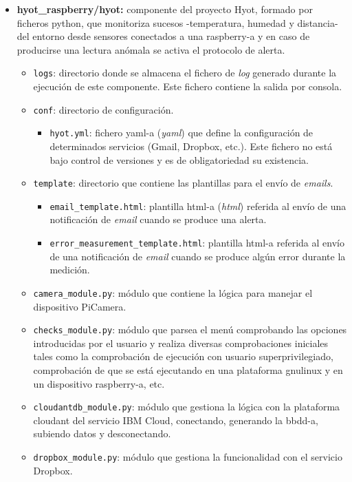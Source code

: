 \documentclass[12pt,a4paper, twoside]{report}
\begin{document}
\begin{itemize}
		\item \textbf{hyot\_raspberry/hyot:} componente del proyecto Hyot, formado por ficheros \gls{python}, que monitoriza sucesos -temperatura, humedad y distancia- del entorno desde sensores conectados a una \gls{raspberry-a} y en caso de producirse una lectura anómala se activa el protocolo de alerta.
		\begin{itemize}
			\item \texttt{logs}: directorio donde se almacena el fichero de \textit{log} generado durante la ejecución de este componente. Este fichero contiene la salida por consola.
			\item \texttt{conf}: directorio de configuración.
			\begin{itemize}
				\item \texttt{hyot.yml}: fichero \gls{yaml-a} (\textit{\gls{yaml}}) que define la configuración de determinados servicios (Gmail, Dropbox, etc.). Este fichero no está bajo control de versiones y es de obligatoriedad su existencia.
			\end{itemize}
			\item \texttt{template}: directorio que contiene las plantillas para el envío de \textit{emails}.
			\begin{itemize}
				\item \texttt{email\_template.html}: plantilla \gls{html-a} (\textit{\gls{html}}) referida al envío de una notificación de \textit{email} cuando se produce una alerta.
				\item \texttt{error\_measurement\_template.html}: plantilla \gls{html-a} referida al envío de una notificación de \textit{email} cuando se produce algún error durante la medición.
			\end{itemize}
			\item \texttt{camera\_module.py}: módulo que contiene la lógica para manejar el dispositivo PiCamera.
			\item \texttt{checks\_module.py}: módulo que parsea el menú comprobando las opciones introducidas por el usuario y realiza diversas comprobaciones iniciales tales como la comprobación de ejecución con usuario superprivilegiado, comprobación de que se está ejecutando en una plataforma \gls{gnulinux} y en un dispositivo \gls{raspberry-a}, etc.
			\item \texttt{cloudantdb\_module.py}: módulo que gestiona la lógica con la plataforma \gls{cloudant} del servicio IBM Cloud, conectando, generando la \gls{bbdd-a}, subiendo datos y desconectando. 
			\item \texttt{dropbox\_module.py}: módulo que gestiona la funcionalidad con el servicio Dropbox.

\end{itemize}
\end{itemize}
\end{document}
